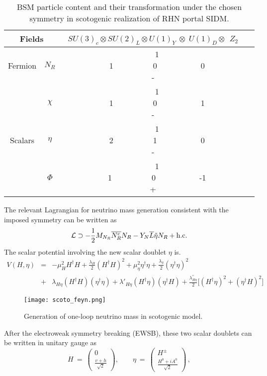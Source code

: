 \documentclass[prd,nofootinbib,preprint,superscriptaddress]{revtex4}
\begin{document}
\begin{table}[h!]
	\begin{tabular}{|c|c|c|c|}
		\hline \multicolumn{2}{|c}{Fields}&  \multicolumn{1}{|c|}{ $SU(3)_c \otimes SU(2)_L \otimes U(1)_Y$ $\otimes~~  U(1)_D \otimes~~Z_2$  } \\ \hline
		{Fermion} &  $N_R$&  ~~1 ~~~~~~~~~~~1~~~~~~~~~~0~~~~~~~~~~~0~~~~~~~~~ - \\ %
		& $\chi$  & ~~1 ~~~~~~~~~~~1~~~~~~~~~~0~~~~~~~~~~~1~~~~~~~~~ - \\
		[0.5em] \cline{2-3}
		\hline
		Scalars & $\eta$ &~~1 ~~~~~~~~~~~2~~~~~~~~~~1~~~~~~~~~~~0~~~~~~~~~ - \\
		& $\Phi$ & ~~1 ~~~~~~~~~~~1~~~~~~~~~~0~~~~~~~~~~~-1~~~~~~~~~ + \\
		\hline
	\end{tabular}
\caption{BSM particle content and their transformation under the chosen symmetry in scotogenic realization of RHN portal SIDM.}
\label{tab:tab1}
\end{table}
The relevant Lagrangian for neutrino mass generation consistent with the imposed symmetry can be written as
\begin{equation}
\mathcal{L} \supset -\frac{1}{2}M_{N_R} \overline{N^c_R} N_R - Y_N \overline{L} \tilde{\eta} N_R +  {\rm h.c.}
\end{equation}
The scalar potential involving the new scalar doublet $\eta$ is.
\begin{eqnarray}
V(H,\eta)&=&-\mu^2_H H^\dagger H + \frac{\lambda_H}{2}(H^\dagger H)^2+\mu^2_\eta \eta^\dagger \eta + \frac{\lambda_\eta}{2}(\eta^\dagger \eta)^2\nonumber\\&+&\lambda_{H \eta} (H^\dagger H)(\eta^\dagger \eta)+\lambda'_{H \eta} (H^\dagger \eta)(\eta^\dagger H)+\frac{\lambda^{''}_{H \eta}}{2}\big[(H^\dagger \eta)^2+(\eta^\dagger H)^2\big]
\end{eqnarray}
\begin{figure}[h!]
\centering
\texttt{[image: scoto\_feyn.png]}
\caption{Generation of one-loop neutrino mass in scotogenic model.}
\label{scoto}
\end{figure}
After the electroweak symmetry breaking (EWSB), these two scalar doublets can be written in unitary gauge as
\begin{equation}
H \ = \ \begin{pmatrix} 0 \\  \frac{ v +h }{\sqrt 2} \end{pmatrix} , \qquad \eta \ = \ \begin{pmatrix} H^\pm\\  \frac{H^0+iA^0}{\sqrt 2} \end{pmatrix} \, ,
\label{eq:idm}
\end{equation}
\end{document}
